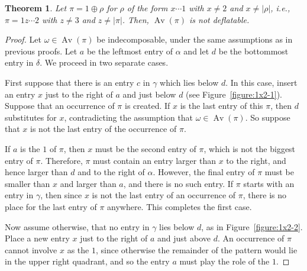 \documentclass[10pt]{article}
\theoremstyle{plain}
\newtheorem{theorem}{Theorem}[section]
\newcommand{\Av}{\operatorname{Av}}
\begin{document}
\begin{theorem}
	\label{theorem:1...2}
	Let $\pi = 1 \oplus \rho$ for $\rho$ of the form $x\cdots1$ with $x \neq 2$ and $x \neq |\rho|$, i.e., $\pi = 1z\cdots2$ with $z \neq 3$ and $z \neq |\pi|$. Then, $\Av(\pi)$ is not deflatable.
\end{theorem}
\begin{proof}
	Let $\omega \in \Av(\pi)$ be indecomposable, under the same assumptions as in previous proofs. Let $a$ be the leftmost entry of $\alpha$ and let $d$ be the bottommost entry in $\delta$. We proceed in two separate cases.

	First suppose that there is an entry $c$ in $\gamma$ which lies below $d$. In this case, insert an entry $x$ just to the right of $a$ and just below $d$ (see Figure~\ref{figure:1x2-1}). Suppose that an occurrence of $\pi$ is created. If $x$ is the last entry of this $\pi$, then $d$ substitutes for $x$, contradicting the assumption that $\omega \in \Av(\pi)$. So suppose that $x$ is not the last entry of the occurrence of $\pi$.

	If $a$ is the $1$ of $\pi$, then $x$ must be the second entry of $\pi$, which is not the biggest entry of $\pi$. Therefore, $\pi$ must contain an entry larger than $x$ to the right, and hence larger than $d$ and to the right of $\alpha$. However, the final entry of $\pi$ must be smaller than $x$ and larger than $a$, and there is no such entry. If $\pi$ starts with an entry in $\gamma$, then since $x$ is not the last entry of an occurrence of $\pi$, there is no place for the last entry of $\pi$ anywhere. This completes the first case.
	
	Now assume otherwise, that no entry in $\gamma$ lies below $d$, as in Figure~\ref{figure:1x2-2}. Place a new entry $x$ just to the right of $a$ and just above $d$. An occurrence of $\pi$ cannot involve $x$ as the $1$, since otherwise the remainder of the pattern would lie in the upper right quadrant, and so the entry $a$ must play the role of the $1$.
	

\end{proof}
\end{document}
